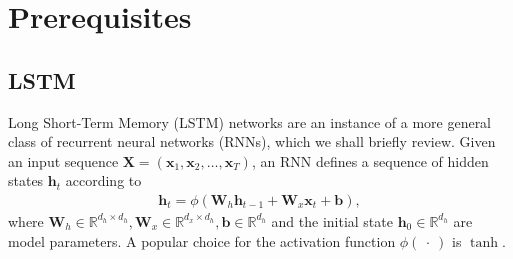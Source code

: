 \documentclass{article} %
\newcommand{\vect}[1]{\mathbf{#1}}
\newcommand{\mat}[1]{\mathbf{#1}}
\newcommand{\reals}{\mathbb{R}}
\begin{document}
\section{Prerequisites}
\label{sec:prerequisites}

\subsection{LSTM}

Long Short-Term Memory (LSTM) networks are an instance of a more general class of recurrent neural networks (RNNs),
which we shall briefly review.
Given an input sequence $\mat{X} = ( \vect{x}_1, \vect{x}_2, \ldots, \vect{x}_T )$,
an RNN defines a sequence of hidden states $\vect{h}_t$ according to
\begin{eqnarray}
  \vect{h}_t = \phi(\mat{W}_h \vect{h}_{t-1} + \mat{W}_x  \vect{x}_t + \vect{b}),
\end{eqnarray}
where $\mat{W}_h \in \reals^{d_h \times d_h}, \mat{W}_x \in \reals^{d_x \times d_h}, \vect{b} \in \reals^{d_h}$
and the initial state $\vect{h}_0 \in \reals^{d_h}$ %
are model parameters.
A popular choice for the activation function $\phi(\ \cdot\ )$ is $\tanh$.
\end{document}
